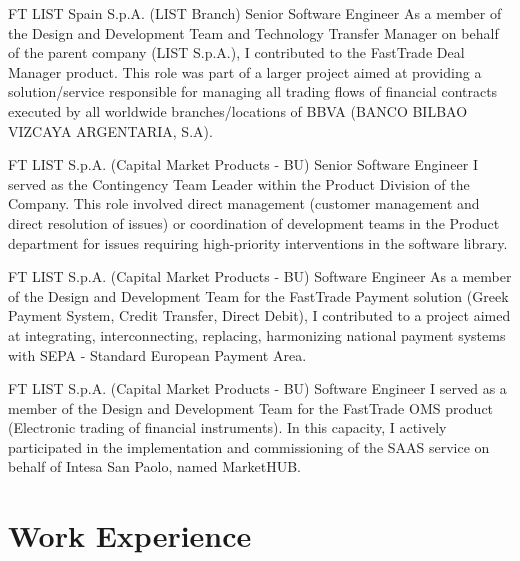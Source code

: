 \documentclass[10pt]{article} %
\begin{document}
\begin{paracol}{2}
{FT} %
{LIST Spain S.p.A. (LIST Branch)} %
{Senior Software Engineer} %
{As a member of the Design and Development Team and Technology Transfer Manager on behalf of the parent
company (LIST S.p.A.), I contributed to the FastTrade Deal Manager product. This role was part of a larger
project aimed at providing a solution/service responsible for managing all trading flows of financial contracts
executed by all worldwide branches/locations of BBVA (BANCO BILBAO VIZCAYA ARGENTARIA, S.A).} %

{FT} %
{LIST S.p.A. (Capital Market Products - BU)} %
{Senior Software Engineer} %
{I served as the Contingency Team Leader within the Product Division of the Company. This role involved direct
management (customer management and direct resolution of issues) or coordination of development teams in the
Product department for issues requiring high-priority interventions in the software library.
} %

{FT} %
{LIST S.p.A. (Capital Market Products - BU)} %
{Software Engineer} %
{As a member of the Design and Development Team for the FastTrade Payment solution (Greek Payment System,
Credit Transfer, Direct Debit), I contributed to a project aimed at integrating, interconnecting, replacing,
harmonizing national payment systems with SEPA - Standard European Payment Area.} %

{FT} %
{LIST S.p.A. (Capital Market Products - BU)} %
{Software Engineer} %
{I served as a member of the Design and Development Team for the FastTrade OMS product (Electronic trading of
financial instruments). In this capacity, I actively participated in the implementation and commissioning of
the SAAS service on behalf of Intesa San Paolo, named MarketHUB.} %

\newpage

\section{Work Experience}


\end{paracol}
\end{document}
